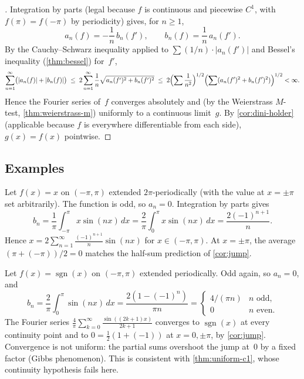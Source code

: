 \begin{proof}[]
Integration by parts (legal because $f$ is continuous and piecewise
$C^1$, with $f(\pi) = f(-\pi)$ by periodicity) gives, for $n \ge 1$,
\[
  a_n(f) = -\frac{1}{n}\, b_n(f'), \qquad b_n(f) = \frac{1}{n}\, a_n(f').
\]
By the Cauchy--Schwarz inequality applied to
$\sum (1/n) \cdot |a_n(f')|$ and Bessel's inequality
(\cref{thm:bessel}) for~$f'$,
\[
  \sum_{n=1}^{\infty} \bigl(|a_n(f)| + |b_n(f)|\bigr)
  \;\le\; 2 \sum_{n=1}^{\infty} \frac{1}{n} \sqrt{a_n(f')^2 + b_n(f')^2}
  \;\le\; 2 \Bigl(\sum \frac{1}{n^2}\Bigr)^{1/2} \Bigl(\sum (a_n(f')^2 + b_n(f')^2)\Bigr)^{1/2} < \infty.
\]
Hence the Fourier series of~$f$ converges absolutely and (by the
Weierstrass $M$-test, \cref{thm:weierstrass-m}) uniformly to a
continuous limit~$g$. By \cref{cor:dini-holder} (applicable
because $f$ is everywhere differentiable from each side), $g(x) = f(x)$
pointwise.
\end{proof}

\subsection*{Examples}

\begin{example}
\label{ex:sawtooth}
Let $f(x) = x$ on $(-\pi, \pi)$ extended $2\pi$-periodically (with
the value at $x = \pm\pi$ set arbitrarily). The function is odd, so
$a_n = 0$. Integration by parts gives
\[
  b_n = \frac{1}{\pi} \int_{-\pi}^{\pi} x \sin(nx)\, dx
       = \frac{2}{\pi} \int_{0}^{\pi} x \sin(nx)\, dx
       = \frac{2 (-1)^{n+1}}{n}.
\]
Hence $x = 2 \sum_{n=1}^{\infty} \frac{(-1)^{n+1}}{n} \sin(nx)$ for
$x \in (-\pi, \pi)$. At $x = \pm\pi$, the average $(\pi + (-\pi))/2 = 0$
matches the half-sum prediction of \cref{cor:jump}.
\end{example}

\begin{example}
\label{ex:square}
Let $f(x) = \operatorname{sgn}(x)$ on $(-\pi, \pi)$ extended
periodically. Odd again, so $a_n = 0$, and
\[
  b_n = \frac{2}{\pi} \int_{0}^{\pi} \sin(nx)\, dx
       = \frac{2 (1 - (-1)^n)}{\pi n}
       = \begin{cases} 4/(\pi n) & n \text{ odd},\\ 0 & n \text{ even}. \end{cases}
\]
The Fourier series
$\frac{4}{\pi} \sum_{k = 0}^{\infty} \frac{\sin((2k+1) x)}{2k+1}$
converges to $\operatorname{sgn}(x)$ at every continuity point and to
$0 = \tfrac12(1 + (-1))$ at $x = 0, \pm\pi$, by \cref{cor:jump}.
Convergence is not uniform: the partial sums overshoot the jump
at~$0$ by a fixed factor (Gibbs phenomenon). This is consistent with
\cref{thm:uniform-c1}, whose continuity hypothesis fails here.
\end{example}

